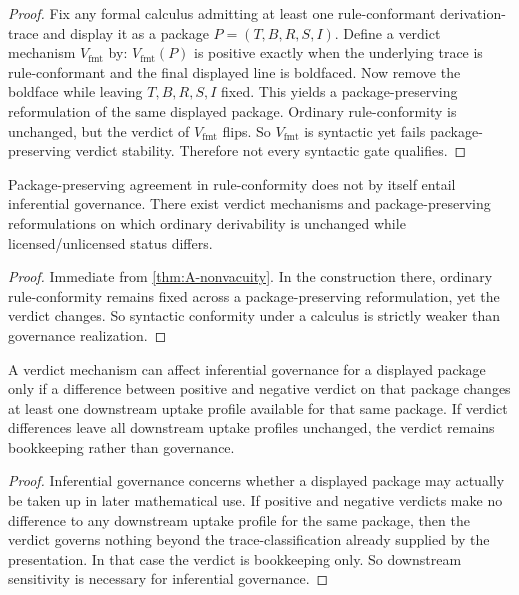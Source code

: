 \begin{proof}
Fix any formal calculus admitting at least one rule-conformant derivation-trace and display it as a package $P=(T,B,R,S,I)$. Define a verdict mechanism $V_{\mathrm{fmt}}$ by: $V_{\mathrm{fmt}}(P)$ is positive exactly when the underlying trace is rule-conformant and the final displayed line is boldfaced. Now remove the boldface while leaving $T,B,R,S,I$ fixed. This yields a package-preserving reformulation of the same displayed package. Ordinary rule-conformity is unchanged, but the verdict of $V_{\mathrm{fmt}}$ flips. So $V_{\mathrm{fmt}}$ is syntactic yet fails package-preserving verdict stability. Therefore not every syntactic gate qualifies.
\end{proof}

\begin{theorem}
\label{thm:A-syntax-weaker}
Package-preserving agreement in rule-conformity does not by itself entail inferential governance. There exist verdict mechanisms and package-preserving reformulations on which ordinary derivability is unchanged while licensed/unlicensed status differs.
\end{theorem}

\begin{proof}
Immediate from \cref{thm:A-nonvacuity}. In the construction there, ordinary rule-conformity remains fixed across a package-preserving reformulation, yet the verdict changes. So syntactic conformity under a calculus is strictly weaker than governance realization.
\end{proof}

\begin{theorem}
\label{thm:A-trajectory-sensitive}
A verdict mechanism can affect inferential governance for a displayed package only if a difference between positive and negative verdict on that package changes at least one downstream uptake profile available for that same package. If verdict differences leave all downstream uptake profiles unchanged, the verdict remains bookkeeping rather than governance.
\end{theorem}

\begin{proof}
Inferential governance concerns whether a displayed package may actually be taken up in later mathematical use. If positive and negative verdicts make no difference to any downstream uptake profile for the same package, then the verdict governs nothing beyond the trace-classification already supplied by the presentation. In that case the verdict is bookkeeping only. So downstream sensitivity is necessary for inferential governance.
\end{proof}

